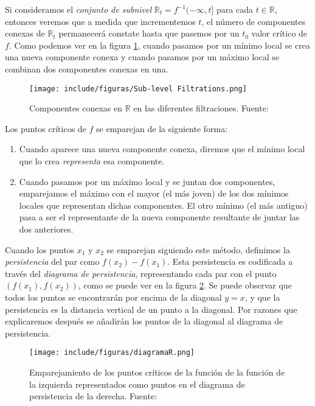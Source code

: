 Si consideramos el \emph{conjunto de subnivel} $\mathbb{R}_t=f^{-1}(-\infty, t]$ para cada $t \in \mathbb{R}$, entonces veremos que a medida que incrementemos $t$, el número de componentes conexas de $\mathbb{R}_t$ permanecerá constate hasta que pasemos por un $t_0$ valor crítico de $f$. Como podemos ver en la figura \ref{ref:subnivelR}, cuando pasamos por un mínimo local se crea una nueva componente conexa y cuando pasamos por un máximo local se combinan dos componentes conexas en una.

\begin{figure}[!ht]
\centering
\texttt{[image: include/figuras/Sub-level Filtrations.png]} 
\caption{Componentes conexas en $\mathbb{R}$ en las diferentes filtraciones. Fuente: \cite{presentacionJustin}}
\label{ref:subnivelR}
\end{figure}

Los puntos críticos de $f$ se emparejan de la siguiente forma: 
\begin{enumerate}
	\item Cuando aparece una nueva componente conexa, diremos que el mínimo local que lo crea \emph{representa} esa componente.  
	\item Cuando pasamos por un máximo local y se juntan dos componentes, emparejamos el máximo con el mayor (el más joven) de los dos mínimos locales que representan dichas componentes. El otro mínimo (el más antiguo) pasa a ser el representante de la nueva componente resultante de juntar las dos anteriores.
\end{enumerate}

Cuando los puntos $x_1$ y $x_2$ se emparejan siguiendo este método, definimos la \emph{persistencia} del par como $f(x_2) - f(x_1)$. Esta persistencia es codificada a través del \emph{diagrama de persistencia}, representando cada par con el punto $(f(x_1),f(x_2))$, como se puede ver en la figura \ref{ref:persistenciaR}. Se puede observar que todos los puntos se encontrarán por encima de la diagonal $y=x$, y que la persistencia es la distancia vertical de un punto a la diagonal. Por razones que explicaremos después se añadirán los puntos de la diagonal al diagrama de persistencia. 

\begin{figure}[!ht]
\centering
\texttt{[image: include/figuras/diagramaR.png]} 
\caption{Emparejamiento de los puntos críticos de la función de la función de la izquierda representados como puntos en el diagrama de persistencia de la derecha. Fuente: \cite{articuloPersistenciaEH}}
\label{ref:persistenciaR}
\end{figure}

